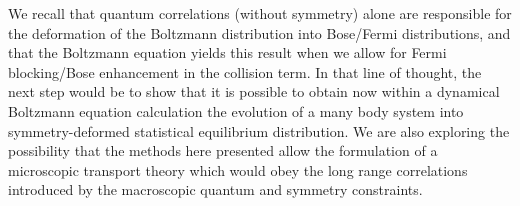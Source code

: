 \documentclass[a4paper,11pt]{article}
\begin{document}
We recall  that quantum correlations (without symmetry) alone are
responsible for the deformation of the Boltzmann distribution into
Bose/Fermi distributions, and that the Boltzmann equation yields
this result when we allow for Fermi blocking/Bose enhancement in
the collision term. In that line of thought, the next step would
be to show that it is possible to obtain now within a dynamical
Boltzmann equation calculation the evolution of a many body system
into symmetry-deformed statistical equilibrium distribution. We
are also exploring the possibility that the methods here presented
allow the formulation of a microscopic transport theory which
would obey the long range correlations introduced by the
macroscopic quantum and symmetry constraints.


\end{document}
